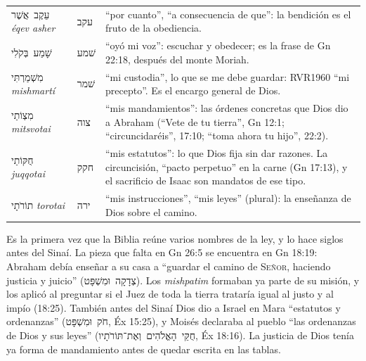 \documentclass[11pt,letterpaper]{article}
\newcommand{\heb}[1]{\mbox{\foreignlanguage{hebrew}{#1}}}
\newcommand{\SENOR}{\textsc{Señor}}
\begin{document}
\begin{filologia}[Gn 26:5]
\begin{tabular}{@{}L{3.2cm}L{1.6cm}L{10cm}@{}}
\heb{עֵקֶב אֲשֶׁר} \emph{éqev asher} & \heb{עקב} & ``por cuanto'', ``a consecuencia de que'': la bendición es el fruto de la obediencia. \\[2pt]
\heb{שָׁמַע בְּקֹלִי} & \heb{שׁמע} & ``oyó mi voz'': escuchar y obedecer; es la frase de Gn 22:18, después del monte Moriah. \\[2pt]
\heb{מִשְׁמַרְתִּי} \emph{mishmartí} & \heb{שׁמר} & ``mi custodia'', lo que se me debe guardar: RVR1960 ``mi precepto''. Es el encargo general de Dios. \\[2pt]
\heb{מִצְוֹתַי} \emph{mitsvotai} & \heb{צוה} & ``mis mandamientos'': las órdenes concretas que Dios dio a Abraham (``Vete de tu tierra'', Gn 12:1; ``circuncidaréis'', 17:10; ``toma ahora tu hijo'', 22:2). \\[2pt]
\heb{חֻקּוֹתַי} \emph{juqqotai} & \heb{חקק} & ``mis estatutos'': lo que Dios fija sin dar razones. La circuncisión, ``pacto perpetuo'' en la carne (Gn 17:13), y el sacrificio de Isaac son mandatos de ese tipo. \\[2pt]
\heb{תוֹרֹתָי} \emph{torotai} & \heb{ירה} & ``mis instrucciones'', ``mis leyes'' (plural): la enseñanza de Dios sobre el camino. \\
\end{tabular}
\end{filologia}

Es la primera vez que la Biblia reúne varios nombres de la ley, y lo hace siglos antes del Sinaí. La pieza que falta en Gn 26:5 se encuentra en Gn 18:19: Abraham debía enseñar a su casa a ``guardar el camino de \SENOR, haciendo justicia y juicio'' (\heb{צְדָקָה וּמִשְׁפָּט}). Los \emph{mishpatim} formaban ya parte de su misión, y los aplicó al preguntar si el Juez de toda la tierra trataría igual al justo y al impío (18:25). También antes del Sinaí Dios dio a Israel en Mara ``estatutos y ordenanzas'' (\heb{חֹק וּמִשְׁפָּט}, Éx 15:25), y Moisés declaraba al pueblo ``las ordenanzas de Dios y sus leyes'' (\heb{חֻקֵּי הָאֱלֹהִים וְאֶת־תּוֹרֹתָיו}, Éx 18:16). La justicia de Dios tenía ya forma de mandamiento antes de quedar escrita en las tablas.
\end{document}
